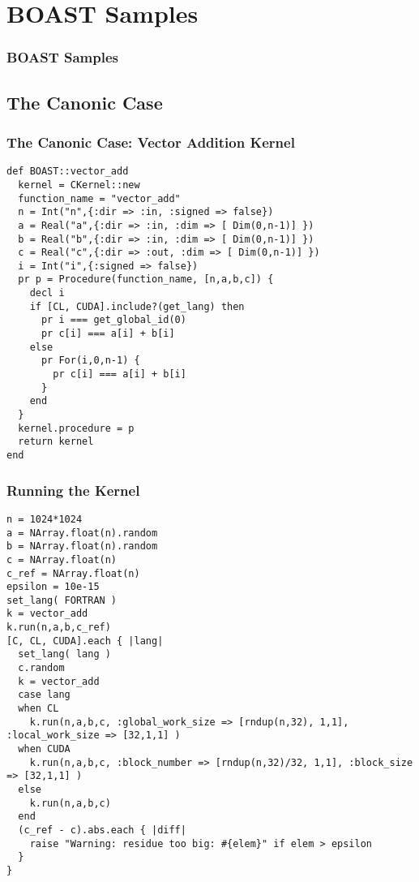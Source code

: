 \documentclass{beamer}
\begin{document}
\section{BOAST Samples}
\begin{frame}
\frametitle{BOAST Samples}

\end{frame}

\subsection{The Canonic Case}
\begin{frame}[fragile]
\frametitle{The Canonic Case: Vector Addition Kernel}
\tiny
\lstset{style=BOAST}
\begin{lstlisting}
def BOAST::vector_add
  kernel = CKernel::new
  function_name = "vector_add"
  n = Int("n",{:dir => :in, :signed => false})
  a = Real("a",{:dir => :in, :dim => [ Dim(0,n-1)] })
  b = Real("b",{:dir => :in, :dim => [ Dim(0,n-1)] })
  c = Real("c",{:dir => :out, :dim => [ Dim(0,n-1)] })
  i = Int("i",{:signed => false})
  pr p = Procedure(function_name, [n,a,b,c]) {
    decl i
    if [CL, CUDA].include?(get_lang) then
      pr i === get_global_id(0)
      pr c[i] === a[i] + b[i]
    else
      pr For(i,0,n-1) {
        pr c[i] === a[i] + b[i]
      }
    end
  }
  kernel.procedure = p
  return kernel
end
\end{lstlisting}
\end{frame}

\begin{frame}[fragile]
\frametitle{Running the Kernel}
\lstset{style=BOAST}
\tiny
\begin{lstlisting}
n = 1024*1024
a = NArray.float(n).random
b = NArray.float(n).random
c = NArray.float(n)
c_ref = NArray.float(n)
epsilon = 10e-15
set_lang( FORTRAN )
k = vector_add
k.run(n,a,b,c_ref)
[C, CL, CUDA].each { |lang|
  set_lang( lang )
  c.random
  k = vector_add
  case lang
  when CL
    k.run(n,a,b,c, :global_work_size => [rndup(n,32), 1,1], :local_work_size => [32,1,1] )
  when CUDA
    k.run(n,a,b,c, :block_number => [rndup(n,32)/32, 1,1], :block_size => [32,1,1] )
  else
    k.run(n,a,b,c)
  end
  (c_ref - c).abs.each { |diff|
    raise "Warning: residue too big: #{elem}" if elem > epsilon
  }
}
\end{lstlisting}
\end{frame}
\end{document}
